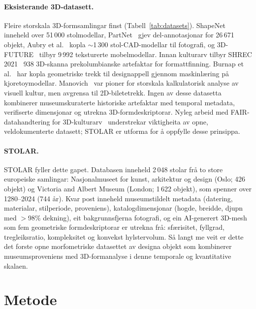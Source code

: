 \paragraph{Eksisterande 3D-datasett.}
Fleire storskala 3D-formsamlingar finst (Tabell~\ref{tab:datasets}).
ShapeNet~\cite{chang2015shapenet} inneheld over 51\,000 stolmodellar,
PartNet~\cite{mo2019partnet} gjev del-annotasjonar for 26\,671 objekt,
Aubry et al.~\cite{aubry2014chairs} kopla $\sim$1\,300 stol-CAD-modellar
til fotografi, og 3D-FUTURE~\cite{fu2021future3d} tilbyr 9\,992 teksturerte mobelmodellar.
Innan kulturarv tilbyr SHREC 2021~\cite{sipiran2021shrec}
938 3D-skanna prekolumbianske artefaktar for formattfinning.
Burnap et al.~\cite{burnap2023aesthetic} har kopla geometriske trekk
til designappell gjennom maskinl\ae ring p\aa{} kjoretoymodellar.
Manovich~\cite{manovich2020cultural} var pioner for storskala kalkulatorisk analyse
av visuell kultur, men avgrensa til 2D-biletetrekk.
Ingen av desse datasetta kombinerer museumskuraterte historiske artefaktar
med temporal metadata, verifiserte dimensjonar og utrekna 3D-formdeskriptorar.
Nyleg arbeid med FAIR-datahandtering for 3D-kulturarv~\cite{wilkinson2016fair,barzaghi2024fair3d}
understrekar viktigheita av opne, veldokumenterte datasett;
STOLAR er utforma for \aa{} oppfylle desse prinsippa.

\paragraph{STOLAR.}
STOLAR fyller dette gapet.
Databasen inneheld 2\,048 stolar fr\aa{} to store europeiske samlingar:
Nasjonalmuseet for kunst, arkitektur og design (Oslo; 426 objekt)
og Victoria and Albert Museum (London; 1\,622 objekt),
som spenner over 1280--2024 (744 \aa r).
Kvar post inneheld museumstildelt metadata (datering, materialar, stilperiode, proveniens),
katalogdimensjonar (hogde, breidde, djupn med $>$98\% dekning),
eit bakgrunnsfjerna fotografi,
og ein AI-generert 3D-mesh som fem geometriske formdeskriptorar er utrekna fr\aa :
sf\ae risitet, fyllgrad, tregleiksratio, kompleksitet og konvekst hylstervolum.
S\aa{} langt me veit er dette det forste opne morfometriske datasettet
av designa objekt som kombinerer museumsproveniens
med 3D-formanalyse i denne temporale og kvantitative skalaen.


\section{Metode}

